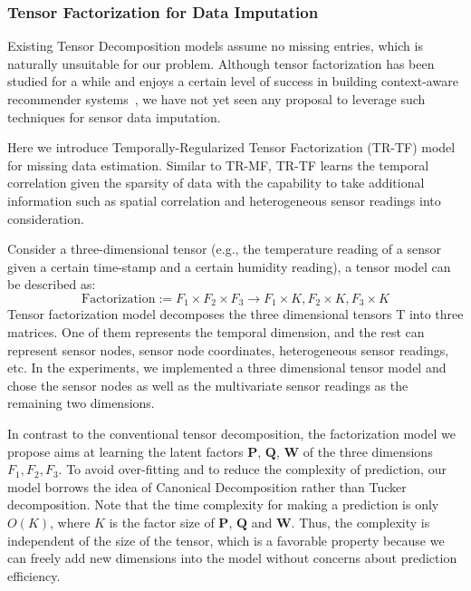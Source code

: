 \subsubsection{Tensor Factorization for Data Imputation} \label{sec:tfmissing}

Existing Tensor Decomposition models assume no missing entries, which is naturally unsuitable for our problem.
Although tensor factorization has been studied for a while and enjoys a certain level of success in building context-aware 
recommender systems~\cite{karatzoglou2010multiverse,rendle2010pairwise}, we have not yet seen any proposal to leverage 
such techniques for sensor data imputation.

Here we introduce Temporally-Regularized Tensor Factorization (TR-TF) model for missing data estimation. 
Similar to TR-MF, TR-TF learns the temporal correlation given the sparsity of data with the capability to take additional information such as spatial correlation and heterogeneous sensor readings into consideration.

Consider a three-dimensional tensor (e.g., the temperature reading of a sensor given a certain time-stamp and a certain humidity reading), a tensor model can be described as:
\begin{equation*}
\mbox{Factorization} :=  F_1 \times  F_2 \times F_3 \rightarrow F_1 \times K, F_2 \times K, F_3 \times K
\end{equation*}
Tensor factorization model decomposes the three dimensional tensors T into three matrices. One of them represents the temporal dimension, and the rest can represent sensor nodes, sensor node coordinates, heterogeneous sensor readings, etc. In the experiments, we implemented a three dimensional tensor model and chose the sensor nodes as well as the multivariate sensor readings as the remaining two dimensions.

In contrast to the conventional tensor decomposition, the factorization model we propose aims at learning the latent factors $\mathbf{P}$,  $\mathbf{Q}$, $\mathbf{W}$ of the three dimensions $F_1, F_2, F_3$.
To avoid over-fitting and to reduce the complexity of prediction, our model borrows the idea of Canonical Decomposition rather than Tucker decomposition. Note that the time complexity for making a prediction is only $O(K)$, where $K$ is the factor size of $\mathbf{P}$, $\mathbf{Q}$ and $\mathbf{W}$. Thus, the complexity is independent of the size of the tensor, which is a favorable property because we can freely add new dimensions into the model without concerns about prediction efficiency.

